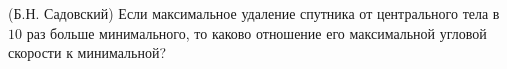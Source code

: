 (Б.Н. Садовский)
Если максимальное удаление спутника от центрального тела в $10$ раз
больше минимального, то каково отношение его максимальной угловой
скорости к минимальной?
